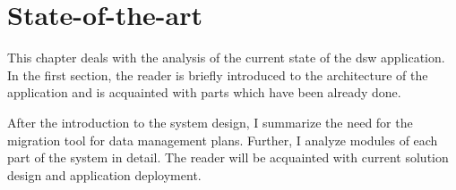 \chapter{State-of-the-art}\label{cptr:state-of-the-art}

This chapter deals with the analysis of the current state of the \gls{dsw} application.
In the first section, the reader is briefly introduced to the architecture of the application and is acquainted with parts which have been already done.

After the introduction to the system design, I summarize the need for the migration tool for data management plans.
Further, I analyze modules of each part of the system in detail.
The reader will be acquainted with current solution design and application deployment.









